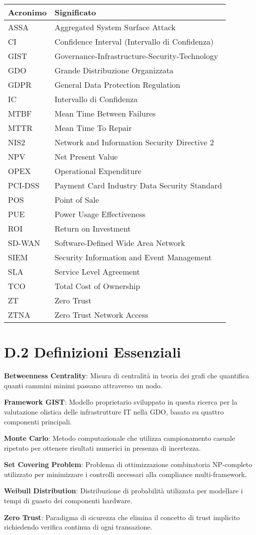 \begin{tabular}{ll}
\textbf{Acronimo} & \textbf{Significato} \\
\hline
ASSA & Aggregated System Surface Attack \\
CI & Confidence Interval (Intervallo di Confidenza) \\
GIST & Governance-Infrastructure-Security-Technology \\
GDO & Grande Distribuzione Organizzata \\
GDPR & General Data Protection Regulation \\
IC & Intervallo di Confidenza \\
MTBF & Mean Time Between Failures \\
MTTR & Mean Time To Repair \\
NIS2 & Network and Information Security Directive 2 \\
NPV & Net Present Value \\
OPEX & Operational Expenditure \\
PCI-DSS & Payment Card Industry Data Security Standard \\
POS & Point of Sale \\
PUE & Power Usage Effectiveness \\
ROI & Return on Investment \\
SD-WAN & Software-Defined Wide Area Network \\
SIEM & Security Information and Event Management \\
SLA & Service Level Agreement \\
TCO & Total Cost of Ownership \\
ZT & Zero Trust \\
ZTNA & Zero Trust Network Access \\
\end{tabular}

\section{D.2 Definizioni Essenziali}

\textbf{Betweenness Centrality}: Misura di centralità in teoria dei grafi che quantifica quanti cammini minimi passano attraverso un nodo.

\textbf{Framework GIST}: Modello proprietario sviluppato in questa ricerca per la valutazione olistica delle infrastrutture IT nella GDO, basato su quattro componenti principali.

\textbf{Monte Carlo}: Metodo computazionale che utilizza campionamento casuale ripetuto per ottenere risultati numerici in presenza di incertezza.

\textbf{Set Covering Problem}: Problema di ottimizzazione combinatoria NP-completo utilizzato per minimizzare i controlli necessari alla compliance multi-framework.

\textbf{Weibull Distribution}: Distribuzione di probabilità utilizzata per modellare i tempi di guasto dei componenti hardware.

\textbf{Zero Trust}: Paradigma di sicurezza che elimina il concetto di trust implicito richiedendo verifica continua di ogni transazione.

